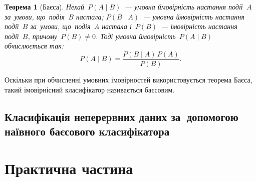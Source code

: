 \documentclass[
	a4paper,
	oneside,
	DIV = 12,
	fontsize = 13pt,
	headings = normal,
	numbers = endperiod,
]{scrartcl}
\theoremstyle{mythm}
\newtheorem{mythm}{Теорема}
\begin{document}
			\begin{mythm}[Баєса]
				\label{thm:theorem-bayes}
				Нехай~$P(A \mid B)$~— умовна ймовірність настання події~$A$ за~умови, що~подія~$B$ настала; $P(B \mid A)$~— умовна ймовірність настання події~$B$ за~умови, що~подія~$A$ настала і~$P(B)$~— імовірність настання події~$B$, причому~$P(B) \neq 0$. Тоді умовна ймовірність~$P(A \mid B)$ обчислюється так:
				\[
					P(A \mid B) = \frac{P(B \mid A) \, P(A)}{P(B)}.
				\]
			\end{mythm}

			Оскільки при обчисленні умовних імовірностей використовується теорема Баєса, такий імовірнісний класифікатор називається баєсовим.

		\subsection{Класифікація неперервних даних за~допомогою наївного баєсового класифікатора}

	\newpage
	\section{Практична частина}

	\newpage

	\newpage
	\printbibliography
\end{document}
